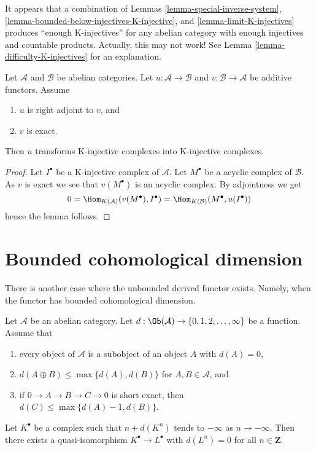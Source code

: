 \noindent
It appears that a combination of Lemmas \ref{lemma-special-inverse-system},
\ref{lemma-bounded-below-injectives-K-injective}, and
\ref{lemma-limit-K-injectives} produces ``enough K-injectives'' for any
abelian category with enough injectives and countable products.
Actually, this may not work! See Lemma \ref{lemma-difficulty-K-injectives}
for an explanation.

\begin{lemma}
\label{lemma-adjoint-preserve-K-injectives}
Let $\mathcal{A}$ and $\mathcal{B}$ be abelian categories.
Let $u : \mathcal{A} \to \mathcal{B}$ and
$v : \mathcal{B} \to \mathcal{A}$ be additive functors. Assume
\begin{enumerate}
\item $u$ is right adjoint to $v$, and
\item $v$ is exact.
\end{enumerate}
Then $u$ transforms K-injective complexes into K-injective complexes.
\end{lemma}

\begin{proof}
Let $I^\bullet$ be a K-injective complex of $\mathcal{A}$.
Let $M^\bullet$ be a acyclic complex of $\mathcal{B}$.
As $v$ is exact we see that $v(M^\bullet)$ is an acyclic complex.
By adjointness we get
$$
0 = \Hom_{K(\mathcal{A})}(v(M^\bullet), I^\bullet) =
\Hom_{K(\mathcal{B})}(M^\bullet, u(I^\bullet))
$$
hence the lemma follows.
\end{proof}





\section{Bounded cohomological dimension}
\label{section-bounded}

\noindent
There is another case where the unbounded derived functor exists.
Namely, when the functor has bounded cohomological dimension.

\begin{lemma}
\label{lemma-replace-resolution}
Let $\mathcal{A}$ be an abelian category. Let
$d : \Ob(\mathcal{A}) \to \{0, 1, 2, \ldots, \infty\}$ be a function.
Assume that
\begin{enumerate}
\item every object of $\mathcal{A}$ is a subobject of an
object $A$ with $d(A) = 0$,
\item $d(A \oplus B) \leq \max \{d(A), d(B)\}$ for $A, B \in \mathcal{A}$, and
\item if $0 \to A \to B \to C \to 0$ is short exact, then
$d(C) \leq \max\{d(A) - 1, d(B)\}$.
\end{enumerate}
Let $K^\bullet$ be a complex such that $n + d(K^n)$ tends to $-\infty$
as $n \to -\infty$. Then there exists a quasi-isomorphism
$K^\bullet \to L^\bullet$ with $d(L^n) = 0$ for all $n \in \mathbf{Z}$.
\end{lemma}

